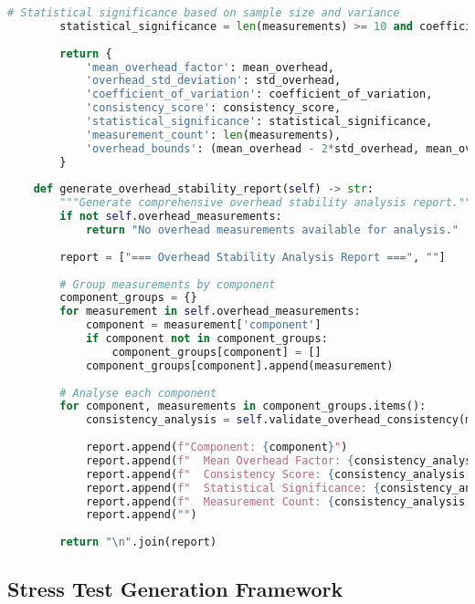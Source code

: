 \begin{lstlisting}[language=Python, caption=Overhead Quantification and Consistency Analysis Framework]
        # Statistical significance based on sample size and variance
        statistical_significance = len(measurements) >= 10 and coefficient_of_variation < 0.3
        
        return {
            'mean_overhead_factor': mean_overhead,
            'overhead_std_deviation': std_overhead,
            'coefficient_of_variation': coefficient_of_variation,
            'consistency_score': consistency_score,
            'statistical_significance': statistical_significance,
            'measurement_count': len(measurements),
            'overhead_bounds': (mean_overhead - 2*std_overhead, mean_overhead + 2*std_overhead)
        }
    
    def generate_overhead_stability_report(self) -> str:
        """Generate comprehensive overhead stability analysis report."""
        if not self.overhead_measurements:
            return "No overhead measurements available for analysis."
        
        report = ["=== Overhead Stability Analysis Report ===", ""]
        
        # Group measurements by component
        component_groups = {}
        for measurement in self.overhead_measurements:
            component = measurement['component']
            if component not in component_groups:
                component_groups[component] = []
            component_groups[component].append(measurement)
        
        # Analyse each component
        for component, measurements in component_groups.items():
            consistency_analysis = self.validate_overhead_consistency(measurements)
            
            report.append(f"Component: {component}")
            report.append(f"  Mean Overhead Factor: {consistency_analysis['mean_overhead_factor']:.3f}")
            report.append(f"  Consistency Score: {consistency_analysis['consistency_score']:.3f}")
            report.append(f"  Statistical Significance: {consistency_analysis['statistical_significance']}")
            report.append(f"  Measurement Count: {consistency_analysis['measurement_count']}")
            report.append("")
        
        return "\n".join(report)
\end{lstlisting}

\subsection{Stress Test Generation Framework}
\label{appendix:stress-generation}

